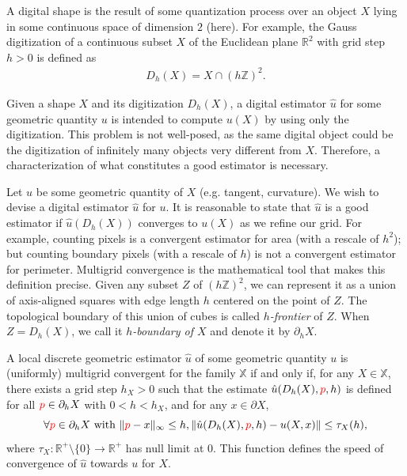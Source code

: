 \documentclass[smallextended]{svjour3}       %
\DeclarePairedDelimiter\norm{\lVert}{\rVert}%
\newcommand{\revision}[1]{\textcolor{red}{#1}}
\begin{document}
A digital shape is the result of some quantization process over an
object $X$ lying in some continuous space of dimension $2$ (here).
For example, the Gauss digitization of a continuous subset $X$ of the
Euclidean plane $\mathbb{R}^2$ with grid step $h>0$ is defined as
\begin{align*}
	D_h(X) = X \cap (h\mathbb{Z})^2.
\end{align*} 

Given a shape $X$ and its digitization $D_h(X)$, a digital estimator $\hat{u}$ for some geometric quantity $u$ is
intended to compute $u(X)$ by using only the digitization. This problem is not well-posed, as the same digital object
could be the digitization of infinitely many objects very different from $X$. Therefore, a characterization of what constitutes
a good estimator is necessary.

Let $u$ be some geometric quantity of $X$ (e.g. tangent, curvature). We wish to devise a digital estimator $\hat{u}$ for
$u$. It is reasonable to state that $\hat{u}$ is a good estimator if $\hat{u}(D_h(X))$ converges to $u(X)$ as we refine
our grid. For example, counting pixels is a convergent estimator for area (with a rescale of $h^2$); but counting
boundary pixels (with a rescale of $h$) is not a convergent estimator for perimeter. Multigrid convergence is the
mathematical tool that makes this definition precise. Given any subset $Z$ of $(h\mathbb{Z})^2$, we can represent it as a
union of axis-aligned squares with edge length $h$ centered on the point of $Z$. The topological boundary of this union
of cubes is called {\em $h$-frontier} of $Z$. When $Z=D_h(X)$, we call it {\em $h$-boundary of $X$} and denote it by
$\partial_h X$.

\begin{definition}
  A local discrete geometric estimator $\hat{u}$ of some geometric
  quantity $u$ is (uniformly) multigrid convergent for the family $\mathbb{X}$ if
  and only if, for any $X \in \mathbb{X}$, there exists a grid step
  $h_X>0$ such that the estimate $\hat{u}(D_h(X), \revision{p},h)$ is
  defined for all $\revision{p} \in \partial_hX$ with $ 0 < h < h_X$, and
  for any $x \in \partial X$,
  \begin{equation*}
    \forall \revision{p} \in  \partial_hX \text{ with } \norm{ \revision{p} - x }_{\infty} \leq h, \norm{ \hat{u}(D_h(X),\revision{p},h) - u(X,x)} \leq \tau_{X}(h),			
  \end{equation*}
  where $\tau_{X}:\mathbb{R}^{+}\setminus\{0\} \rightarrow
  \mathbb{R}^{+}$ has null limit at $0$. This function defines the
  speed of convergence of $\hat{u}$ towards $u$ for $X$.
\end{definition}
	
\end{document}
